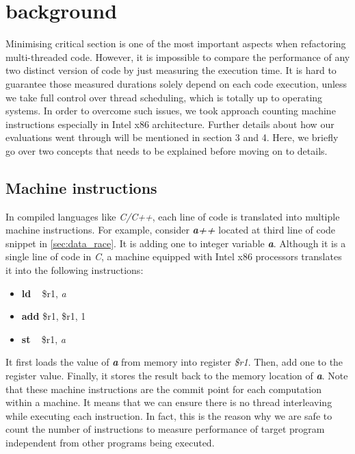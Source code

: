 \section{background}
\label{sec:background}

Minimising critical section is one of the most important aspects when refactoring multi-threaded code. However, it is impossible to compare the performance of any two distinct version of code by just measuring the execution time. It is hard to guarantee those measured durations solely depend on each code execution, unless we take full control over thread scheduling, which is totally up to operating systems. In order to overcome such issues, we took approach counting machine instructions especially in Intel x86 architecture. Further details about how our evaluations went through will be mentioned in section 3 and 4. Here, we briefly go over two concepts that needs to be explained before moving on to details.



\subsection{Machine instructions}
In compiled languages like \textit{C/C++}, each line of code is translated into multiple machine instructions. For example, consider \textbf{\textit{a++}} located at third line of code snippet in \ref{sec:data_race}. It is adding one to integer variable \textbf{\textit{a}}. Although it is a single line of code in \textit{C}, a machine equipped with Intel x86 processors translates it into the following instructions:
\vspace{0.3cm}
\begin{itemize}
	\item[] \textbf{ld} \,\,\, \$r1, \textit{a}
	\item[] \textbf{add} \$r1, \$r1, 1
	\item[] \textbf{st} \,\,\, \$r1, \textit{a}
\end{itemize}

It first loads the value of \textbf{\textit{a}} from memory into register \textit{\$r1}. Then, add one to the register value. Finally, it stores the result back to the memory location of \textbf{\textit{a}}. Note that these machine instructions are the commit point for each computation within a machine. It means that we can ensure there is no thread interleaving while executing each instruction. In fact, this is the reason why we are safe to count the number of instructions to measure performance of target program independent from other programs being executed.